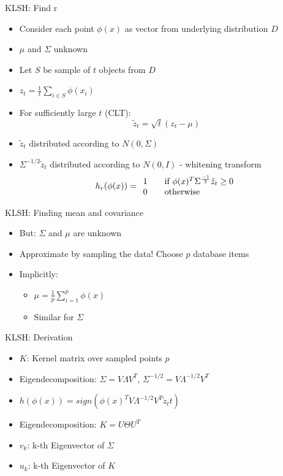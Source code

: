 \documentclass[12pt,a4paper]{beamer}
\begin{document}
\begin{frame}{KLSH: Find r}
\begin{itemize}
\item Consider each point $\phi(x)$ as vector from underlying distribution $D$
\item $\mu$ and $\Sigma$ unknown
\item Let $S$ be sample of $t$ objects from $D$
\item $z_{t} = \frac{1}{t}\sum_{i \in S}{\phi (x_{i})}$
\item For sufficiently large $t$ (CLT):
$$ \tilde{z}_{t} = \sqrt{t}(z_{t} - \mu) $$
\item $ \tilde{z}_{t}$ distributed according to  $N(0,\Sigma)$
\item $\Sigma^{-1/2}\tilde{z}_{t}$ distributed according to $N(0,I)$ - whitening transform 
$$h_r(\phi ( x) )= \begin{array}{l l}
    1 & \quad \text{if } \phi (x)^{T} \Sigma^{\frac{-1}{2}}\tilde{z}_{t} \geq 0\\
    0 & \quad \text{otherwise }
  \end{array}$$
\end{itemize}
\end{frame}



\begin{frame}{KLSH: Finding mean and covariance}
\begin{itemize}
\item But: $\Sigma$ and $\mu$ are unknown
\item Approximate by sampling the data! Choose $p$ database items
\item Implicitly:
    \begin{itemize}
    \item $\mu = \frac{1}{p}\sum_{i=1}^{p}\phi(x)$
    \item Similar for $\Sigma$
    \end{itemize}
\end{itemize}
\end{frame}


\begin{frame}{KLSH: Derivation}
\begin{itemize}
\item $K$: Kernel matrix over sampled points $p$
\item Eigendecomposition: $ \Sigma = V \Lambda V^{T} $, $ \Sigma^{-1/2} = V \Lambda^{-1/2} V^{T}$
\item $h(\phi(x)) = sign(\phi(x)^T V \Lambda^{-1/2} V^{T} \tilde z_t{t})$
\item Eigendecomposition: $K=U \Theta U^{T}$
\item $v_{k}$: k-th Eigenvector of $\Sigma$
\item $u_{k}$: k-th Eigenvector of $K$
\end{itemize}
\end{frame}
\end{document}
